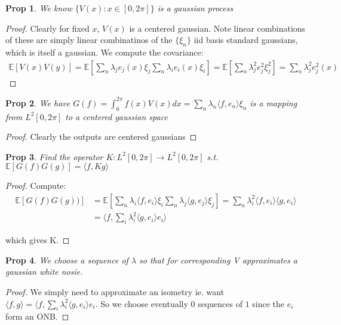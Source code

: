 \documentclass[11pt]{article}
\newcommand{\E}{\mathbb{E}}
\newtheorem{prop}{Prop}
\begin{document}
\begin{prop}
	We know $\{V(x) : x \in [0,2\pi]\}$ is a gaussian process
\end{prop}


\begin{proof}
	Clearly for fixed $x$, $V(x)$ is a centered gaussian. Note linear combinations of these are simply linear combinatinos of the $\{\xi_n\}$ iid basis standard gaussians, which is itself a gaussian. We compute the covariance:
	\begin{align*}
		\E[V(x)V(y)] = \E[\sum_n \lambda_j e_j(x) \xi_j \sum_n \lambda_i e_i(x) \xi_i] = \E[\sum_n \lambda_j^2e_j^2 \xi_j^2] = \sum_n \lambda_j^2e_j^2(x)
	\end{align*}
\end{proof}

\begin{prop}
	We have $G(f) = \int_0^{2\pi} f(x)V(x) dx = \sum_n \lambda_n \langle f,e_n \rangle \xi_n$ is a mapping from $L^2[0,2\pi]$ to a centered gaussian space
\end{prop}

\begin{proof}
	Clearly the outputs are centered gaussians
\end{proof}

\begin{prop}
	Find the operator $K : L^2[0,2\pi] \to L^2[0,2\pi]$ s.t. $\E[G(f)G(g)] = \langle f ,Kg \rangle$ 
\end{prop}

\begin{proof}
	Compute:
	\begin{align*}
	\E[G(f)G(g))] &= \E[\sum_n \lambda_i \langle f ,e_i \rangle \xi_i \sum_n \lambda_j \langle g,e_j\rangle \xi_j] = \sum_n \lambda_i^2 \langle f, e_i \rangle \langle g,e_i\rangle \\
	&= \langle f, \sum_i \lambda_i^2 \langle g ,e_i \rangle e_i \rangle
	\end{align*}

	which gives K.
\end{proof}

\begin{prop}
	We choose a sequence of $\lambda$ so that for corresponding V approximates a gaussian white nosie. 
\end{prop}


\begin{proof}
	We simply need to approximate an isometry ie. want $\langle f,g \rangle = \langle f, \sum_i \lambda_i^2 \langle g,e_i\rangle e_i$. So we choose eventually 0 sequences of $1$ since the $e_i$ form an ONB.
\end{proof}
\end{document}
